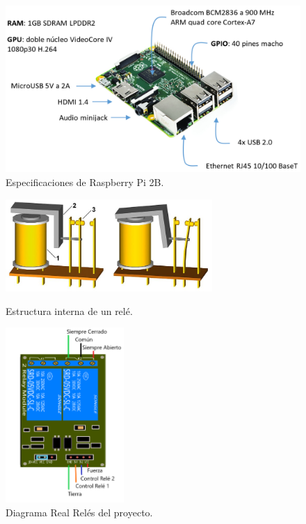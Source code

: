 \begin{figure}
    \centering
    \includegraphics[width=\textwidth]{img/RBP2B.pdf}
    \caption[Especificaciones de Raspberry Pi 2B.]{Especificaciones de Raspberry Pi 2B.}\label{Img:Especificaciones RBP2B}
\end{figure}

\begin{figure}
    \centering
    \includegraphics[width=0.7\textwidth]{img/Rele_1.jpg}
    \caption[Estructura interna de un relé]{Estructura interna de un relé.} \label{Img:Rele1}
    \includegraphics[width=0.4\textwidth]{img/Diagramas/ReleProyecto.png}
    \caption[Diagrama Real Relés del proyecto.]{Diagrama Real Relés del proyecto.} \label{Img:ReleProyecto}
\end{figure}
